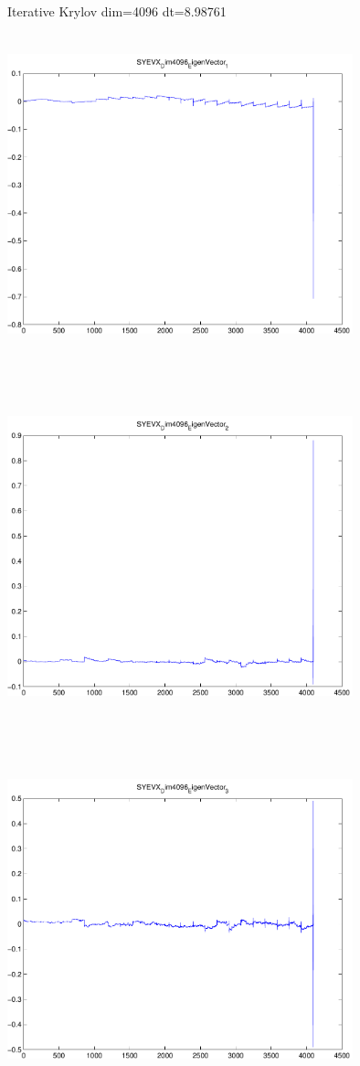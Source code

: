 \documentclass[9pt]{article}
\theoremstyle{plain}
\theoremstyle{definition}
\theoremstyle{remark}
\numberwithin{equation}{section}
\begin{document}
Iterative Krylov dim=4096 dt=8.98761
\includegraphics[width=10.0cm,height=10.0cm]{SYEVX_Dim4096_EigenVector_1.pdf}

\includegraphics[width=10.0cm,height=10.0cm]{SYEVX_Dim4096_EigenVector_2.pdf}

\includegraphics[width=10.0cm,height=10.0cm]{SYEVX_Dim4096_EigenVector_3.pdf}
\end{document}
